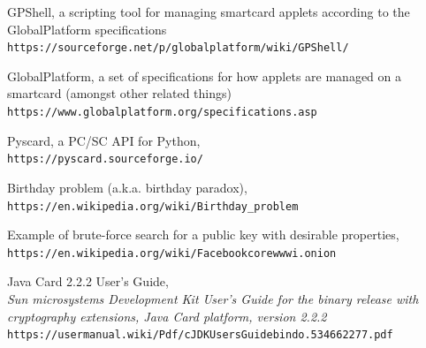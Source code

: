 \documentclass[12pt,a4paper]{article}
\begin{document}
\begin{thebibliography}{9}
	GPShell, a scripting tool for managing smartcard applets according to the GlobalPlatform specifications\\
	\verb|https://sourceforge.net/p/globalplatform/wiki/GPShell/|
	
	GlobalPlatform, a set of specifications for how applets are managed on a smartcard (amongst other related things)\\
	\verb|https://www.globalplatform.org/specifications.asp|
	
	Pyscard, a PC/SC API for Python,\\
	\verb|https://pyscard.sourceforge.io/|
	
	Birthday problem (a.k.a. birthday paradox),\\
	\verb|https://en.wikipedia.org/wiki/Birthday_problem|
	
	Example of brute-force search for a public key with desirable properties,\\
	\verb|https://en.wikipedia.org/wiki/Facebookcorewwwi.onion|
	
	Java Card 2.2.2 User's Guide,\\
	\textit{Sun microsystems Development Kit User's Guide for the binary release with cryptography extensions, Java Card platform, version 2.2.2}\\
	\verb|https://usermanual.wiki/Pdf/cJDKUsersGuidebindo.534662277.pdf|
\end{thebibliography}
\end{document}
